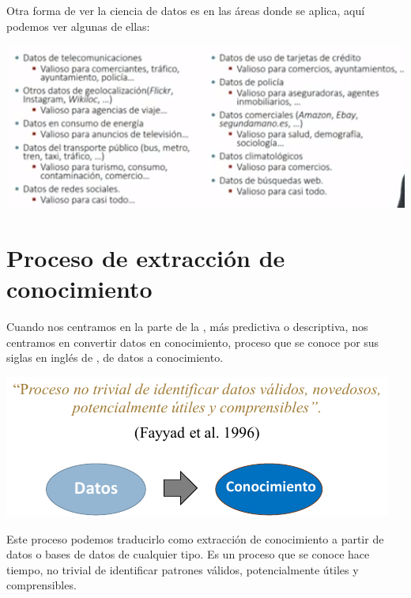 Otra forma de ver la ciencia de datos es en las áreas donde se aplica, aquí podemos ver algunas de ellas:

\begin{center}
    \includegraphics[scale=.9]{images/mod01-14.png}
\end{center}

\section{Proceso de extracción de conocimiento}

Cuando nos centramos en la parte de la , más predictiva o descriptiva, nos centramos en convertir datos en conocimiento, proceso que se conoce por sus siglas en inglés de , de datos a conocimiento.

\begin{center}
    \includegraphics[scale=.9]{images/mod01-15.png}
\end{center}

Este proceso podemos traducirlo como extracción de conocimiento a partir de datos o bases de datos de cualquier tipo. Es un proceso que se conoce hace tiempo, no trivial de identificar patrones válidos, potencialmente útiles y comprensibles.

